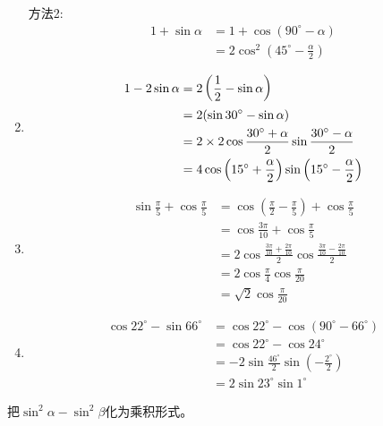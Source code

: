 \begin{solution}
\begin{enumerate}
方法2: 
\[\begin{split}
    1+\sin\alpha &=1+\cos(90^{\circ}-\alpha)\\
    &=2\cos^2\left(45^{\circ}-\frac{\alpha}{2}\right)
\end{split}\]
\item \[\begin{split}
    1-2\sin\alpha &=2\left(\dfrac{1}{2}-\sin\alpha\right)\\
    &=2(\sin30^{\circ}-\sin\alpha)\\
    &=2\times 2\cos\dfrac{30^{\circ}+\alpha}{2}\sin\dfrac{30^{\circ}-\alpha}{2}\\
    &=4\cos\left(15^{\circ}+\dfrac{\alpha}{2}\right)\sin \left(15^{\circ}-\dfrac{\alpha}{2}\right)
\end{split}\]    
\item \[\begin{split}
    \sin\frac{\pi}{5}+\cos\frac{\pi}{5}&= \cos\left(\frac{\pi}{2}-\frac{\pi}{5}\right)+\cos\frac{\pi}{5}\\
    &=\cos\frac{3\pi}{10}+\cos\frac{\pi}{5}\\
    &=2\cos\frac{\frac{3\pi}{10}+\frac{2\pi}{10}}{2}\cos\frac{\frac{3\pi}{10}-\frac{2\pi}{10}}{2} \\
    &=2\cos\frac{\pi}{4}\cos\frac{\pi}{20}\\
    &=\sqrt{2}\cos\frac{\pi}{20}
\end{split}\]    
\item \[\begin{split}
    \cos22^{\circ}-\sin 66^{\circ}&=\cos22^{\circ}-\cos(90^{\circ}-66^{\circ}) \\
    &=\cos22^{\circ}-\cos 24^{\circ}\\
    &=-2\sin\frac{46^{\circ}}{2}\sin\left(-\frac{2^{\circ}}{2}\right)\\
    &=2\sin 23^{\circ}\sin 1^{\circ}
\end{split}\]    
\end{enumerate}
\end{solution}


\begin{example}
    把$\sin^2\alpha-\sin^2\beta$化为乘积形式。
\end{example}

